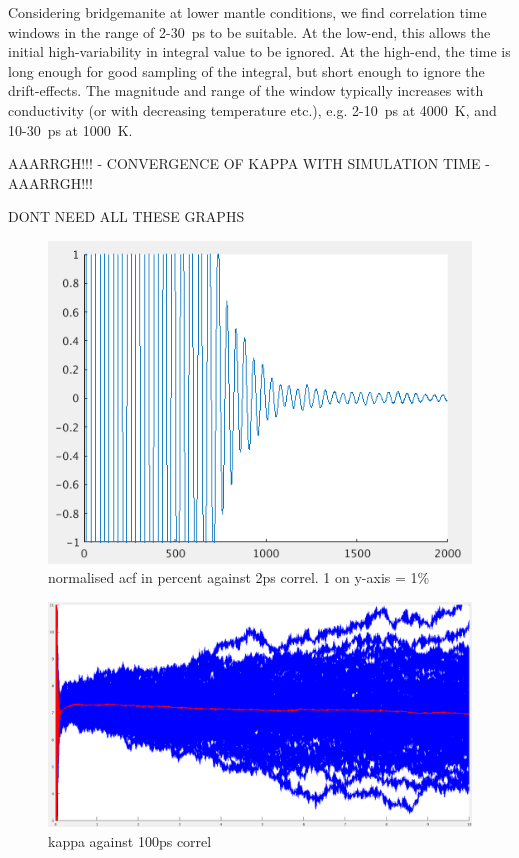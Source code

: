 \documentclass[%
preprint,                                  %
nofootinbib,
 amsmath,amssymb,
 aps,
]{revtex4-1}
\begin{document}
Considering bridgemanite at lower mantle conditions, we find correlation time windows in the range of 2-30~ps to be suitable. At the low-end, this allows the initial high-variability in integral value to be ignored. At the high-end, the time is long enough for good sampling of the integral, but short enough to ignore the drift-effects. The magnitude and range of the window typically increases with conductivity (or with decreasing temperature etc.), e.g. 2-10~ps at 4000~K, and 10-30~ps at 1000~K.




AAARRGH!!! - CONVERGENCE OF KAPPA WITH SIMULATION TIME - AAARRGH!!! 

DONT NEED ALL THESE GRAPHS

\begin{figure}[h!]
  \includegraphics[width=\linewidth]{images/acf_decay_percent_correl.png}
  \caption{normalised acf in percent against 2ps correl. 1 on y-axis = 1\%}
  \label{fig:acf_decay}
\end{figure}

\begin{figure}[h!]
  \includegraphics[width=\linewidth]{images/4x4x3_01-z-ints.png}
  \caption{kappa against 100ps correl}
  \label{fig:int_drift}
\end{figure}
\end{document}
